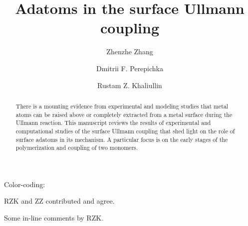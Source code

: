 \documentclass[%
 reprint,
 amsmath,amssymb,
 aps,
prb,
floatfix,
]{revtex4-2}
\newcommand{\lock}{\color{red}}
\newcommand{\lock}{\color{red}}
\newcommand{\comm}{\color{Purple}} %
\begin{document}
\title{Adatoms in the surface Ullmann coupling}

\author{Zhenzhe Zhang}
\author{Dmitrii F. Perepichka}%
\author{Rustam Z. Khaliullin}
%


\begin{abstract}
There is a mounting evidence from experimental and modeling studies that metal atoms can be raised above or completely extracted from a metal surface during the Ullmann reaction. 
This manuscript reviews the results of experimental and computational studies of the surface Ullmann coupling that shed light on the role of surface adatoms in its mechanism. A particular focus is on the early stages of the polymerization and coupling of two monomers.
\end{abstract}

\maketitle





\ifdefined\INTERNAL

Color-coding: 

{\lock RZK and ZZ contributed and agree.}

{\comm Some in-line comments by RZK.}
\end{document}
